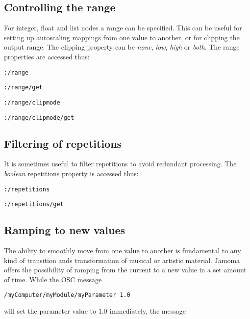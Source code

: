\documentclass{sig-alternate}
\begin{document}

\subsection{Controlling the range} %
\label{sub:range}

For integer, float and list nodes a range can be specified. This can be useful for setting up autoscaling mappings from one value to another, or for clipping the output range. The clipping property can be \emph{none}, \emph{low}, \emph{high} or \emph{both}. The range properties are accessed thus:

\texttt{:/range}

\texttt{:/range/get}

\texttt{:/range/clipmode}

\texttt{:/range/clipmode/get}





\subsection{Filtering of repetitions} %
\label{sub:filtering_of_repetitions}

It is sometimes useful to filter repetitions to avoid redundant processing. The \emph{boolean} repetitions property is accessed thus:

\texttt{:/repetitions}

\texttt{:/repetitions/get}





\subsection{Ramping to new values} %
\label{sub:ramping_to_new_values}

The ability to smoothly move from one value to another is fundamental to any kind of transition ands transformation of musical or artistic material. Jamoma offers the possibility of ramping from the current to a new value in a set amount of time. While the OSC message

\texttt{/myComputer/myModule/myParameter 1.0}

will set the parameter value to $1.0$ immediately, the message
\end{document}
